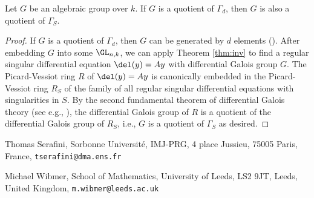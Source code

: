 \documentclass[a4paper, 11pt]{article}
\begin{document}
\begin{corollary}\label{cor:proalg}
	Let $G$ be an algebraic group over $k$. If $G$ is a quotient of $\Gamma_d$, then $G$ is also a quotient of $\Gamma_S$.
\end{corollary}
\begin{proof}
If $G$ is a quotient of $\Gamma_d$, then $G$ can be generated by $d$ elements (\cite[Lemma 2.16]{proalg}). After embedding $G$ into some $\GL_{n,k}$, we can apply Theorem \ref{thm:inv} to find a regular singular differential equation $\del(y)=Ay$ with differential Galois group $G$. The Picard-Vessiot ring $R$ of $\del(y)=Ay$ is canonically embedded in the Picard-Vessiot ring $R_S$ of the family of all regular singular differential equations with singularities in $S$. By the second fundamental theorem of differential Galois theory (see e.g., \cite[Theroem 2.11]{AmanoMasuokaTakeuchi}), the differential Galois group of $R$ is a quotient of the differential Galois group of $R_S$, i.e., $G$ is a quotient of $\Gamma_S$ as desired.
\end{proof}	


%
%


\printbibliography



Thomas Serafini, Sorbonne Université, IMJ-PRG, 4 place Jussieu, 
75005 Paris, France, \texttt{tserafini@dma.ens.fr} 

\medskip

Michael Wibmer, School of Mathematics, University of Leeds, LS2 9JT, Leeds, United Kingdom, \texttt{m.wibmer@leeds.ac.uk}
\end{document}
